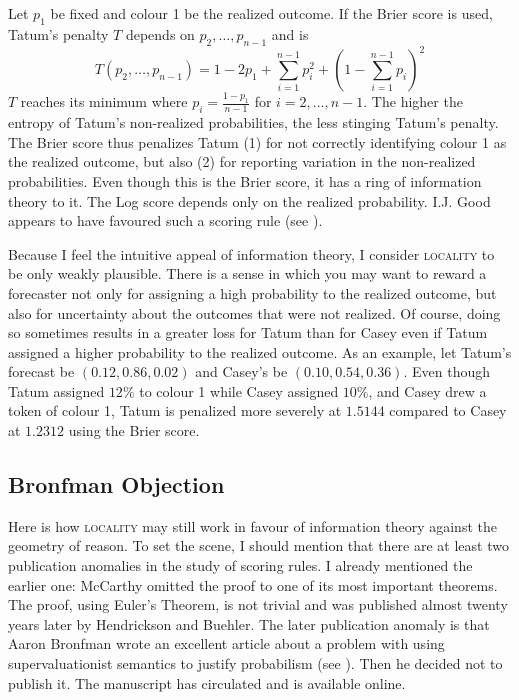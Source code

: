 \documentclass[12pt]{article}
\begin{document}
Let $p_{1}$ be fixed and colour 1 be the realized outcome. If the
Brier score is used, Tatum's penalty $T$ depends on
$p_{2},{\ldots},p_{n-1}$ and is
\begin{equation}
  \label{eq:kaewaeho}
  T(p_{2},{\ldots},p_{n-1})=1-2p_{1}+\sum_{i=1}^{n-1}p_{i}^{2}+\left(1-\sum_{i=1}^{n-1}p_{i}\right)^{2}
\end{equation}
$T$ reaches its minimum where $p_{i}=\frac{1-p_{1}}{n-1}$ for
$i=2,{\ldots},n-1$. The higher the entropy of Tatum's non-realized
probabilities, the less stinging Tatum's penalty. The Brier score thus
penalizes Tatum (1) for not correctly identifying colour 1 as the
realized outcome, but also (2) for reporting variation in the
non-realized probabilities. Even though this is the Brier score, it
has a ring of information theory to it. The Log score depends only on
the realized probability. I.J. Good appears to have favoured such a
scoring rule (see ).

Because I feel the intuitive appeal of information theory, I consider
\textsc{locality} to be only weakly plausible. There is a sense in
which you may want to reward a forecaster not only for assigning a
high probability to the realized outcome, but also for uncertainty
about the outcomes that were not realized. Of course, doing so
sometimes results in a greater loss for Tatum than for Casey even if
Tatum assigned a higher probability to the realized outcome. As an
example, let Tatum's forecast be $(0.12,0.86,0.02)$ and Casey's be
$(0.10,0.54,0.36)$. Even though Tatum assigned $12\%$ to colour 1
while Casey assigned $10\%$, and Casey drew a token of colour 1, Tatum
is penalized more severely at $1.5144$ compared to Casey at $1.2312$
using the Brier score.

\subsection{Bronfman Objection}
\label{subsec:eemeingo}

Here is how \textsc{locality} may still work in favour of information
theory against the geometry of reason. To set the scene, I should
mention that there are at least two publication anomalies in the study
of scoring rules. I already mentioned the earlier one: McCarthy
omitted the proof to one of its most important theorems. The proof,
using Euler's Theorem, is not trivial and was published almost twenty
years later by Hendrickson and Buehler. The later publication anomaly
is that Aaron Bronfman wrote an excellent article about a problem with
using supervaluationist semantics to justify probabilism (see
). Then he decided not to publish it. The
manuscript has circulated and is available online.
\end{document}
